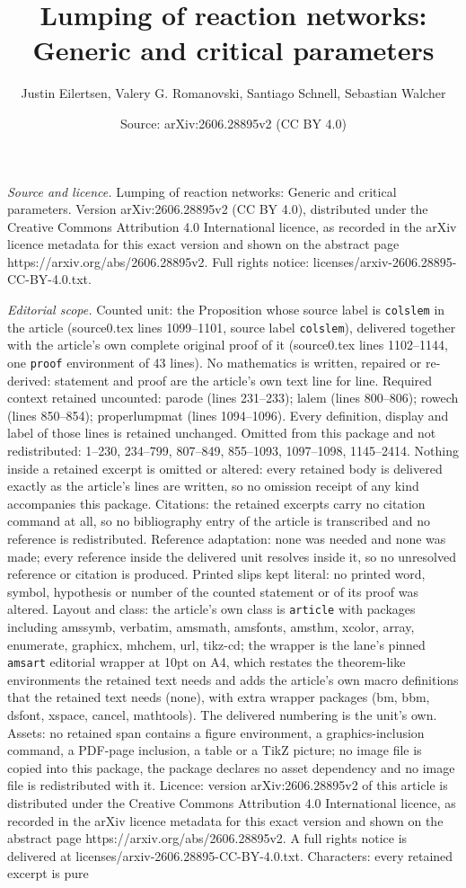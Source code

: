 \documentclass[10pt,a4paper]{amsart}
\title[Lumping of reaction networks: Generic and critical parameter]{Lumping of reaction networks: Generic and critical parameters}
\author{Justin Eilertsen, Valery G. Romanovski, Santiago Schnell, Sebastian Walcher}
\date{Source: arXiv:2606.28895v2 (CC BY 4.0)}
\begin{document}
\maketitle

\noindent\emph{Source and licence.} Lumping of reaction networks: Generic and critical parameters. Version arXiv:2606.28895v2 (CC BY 4.0), distributed under the Creative Commons Attribution 4.0 International licence, as recorded in the arXiv licence metadata for this exact version and shown on the abstract page https://arxiv.org/abs/2606.28895v2. Full rights notice: licenses/arxiv-2606.28895-CC-BY-4.0.txt.\par\smallskip

\noindent\textit{Editorial scope.} Counted unit: the Proposition whose source label is \texttt{colslem} in the article (source0.tex lines 1099--1101, source label \texttt{colslem}), delivered together with the article's own complete original proof of it (source0.tex lines 1102--1144, one \texttt{proof} environment of 43 lines). No mathematics is written, repaired or re-derived: statement and proof are the article's own text line for line. Required context retained uncounted: parode (lines 231--233); lalem (lines 800--806); rowech (lines 850--854); properlumpmat (lines 1094--1096). Every definition, display and label of those lines is retained unchanged. Omitted from this package and not redistributed: 1--230, 234--799, 807--849, 855--1093, 1097--1098, 1145--2414. Nothing inside a retained excerpt is omitted or altered: every retained body is delivered exactly as the article's lines are written, so no omission receipt of any kind accompanies this package. Citations: the retained excerpts carry no citation command at all, so no bibliography entry of the article is transcribed and no reference is redistributed. Reference adaptation: none was needed and none was made; every reference inside the delivered unit resolves inside it, so no unresolved reference or citation is produced. Printed slips kept literal: no printed word, symbol, hypothesis or number of the counted statement or of its proof was altered. Layout and class: the article's own class is \texttt{article} with packages including amssymb, verbatim, amsmath, amsfonts, amsthm, xcolor, array, enumerate, graphicx, mhchem, url, tikz-cd; the wrapper is the lane's pinned \texttt{amsart} editorial wrapper at 10pt on A4, which restates the theorem-like environments the retained text needs and adds the article's own macro definitions that the retained text needs (none), with extra wrapper packages (bm, bbm, dsfont, xspace, cancel, mathtools). The delivered numbering is the unit's own. Assets: no retained span contains a figure environment, a graphics-inclusion command, a PDF-page inclusion, a table or a TikZ picture; no image file is copied into this package, the package declares no asset dependency and no image file is redistributed with it. Licence: version arXiv:2606.28895v2 of this article is distributed under the Creative Commons Attribution 4.0 International licence, as recorded in the arXiv licence metadata for this exact version and shown on the abstract page https://arxiv.org/abs/2606.28895v2. A full rights notice is delivered at licenses/arxiv-2606.28895-CC-BY-4.0.txt. Characters: every retained excerpt is pure 
\end{document}
